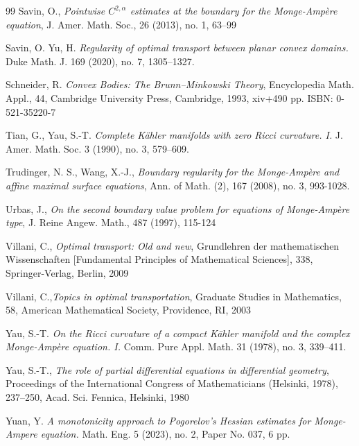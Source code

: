 \documentclass[12pt,reqno]{amsart}
\numberwithin{equation}{section}
\begin{document}
\begin{thebibliography}{99}
         Savin, O., {\em Pointwise {$C^{2,\alpha}$} estimates at the boundary for the {M}onge-{A}mp\`ere equation}, J. Amer. Math. Soc.,  26 (2013), no. 1, 63--99
 
         Savin, O. Yu, H. {\em Regularity of optimal transport between planar convex domains. } Duke Math. J. 169 (2020), no. 7, 1305–1327.

        
         Schneider, R. {\em Convex Bodies: The Brunn–Minkowski Theory}, Encyclopedia Math. Appl., 44, Cambridge University Press, Cambridge, 1993, xiv+490 pp. ISBN: 0-521-35220-7
		  
         Tian, G., Yau, S.-T. {\em Complete K\"ahler manifolds with zero Ricci curvature. I.} J. Amer. Math. Soc. 3 (1990), no. 3, 579–609.
		
         Trudinger, N. S., Wang, X.-J., {\em Boundary regularity for the {M}onge-{A}mp\`ere and affine maximal surface equations}, Ann. of Math. (2), 167 (2008), no. 3, 993-1028.

         Urbas, J., {\em On the second boundary value problem for equations of {M}onge-{A}mp\`ere type}, J. Reine Angew. Math., 487 (1997), 115-124

         Villani, C., {\em Optimal transport: Old and new}, Grundlehren der mathematischen Wissenschaften [Fundamental Principles of Mathematical Sciences], 338, Springer-Verlag, Berlin, 2009

         Villani, C.,{\em Topics in optimal transportation}, Graduate Studies in Mathematics, 58, American Mathematical Society, Providence, RI, 2003
		
        Yau, S.-T. {\em On the Ricci curvature of a compact Kähler manifold and the complex Monge-Amp\`ere equation. I.} Comm. Pure Appl. Math. 31 (1978), no. 3, 339–411.

         Yau, S.-T., {\em The role of partial differential equations in differential geometry}, Proceedings of the {I}nternational {C}ongress of {M}athematicians ({H}elsinki, 1978), 237--250, Acad. Sci. Fennica, Helsinki, 1980

         Yuan, Y. {\em A monotonicity approach to Pogorelov's Hessian estimates for Monge-Ampere equation. } Math. Eng. 5 (2023), no. 2, Paper No. 037, 6 pp.
\end{thebibliography}
\end{document}
